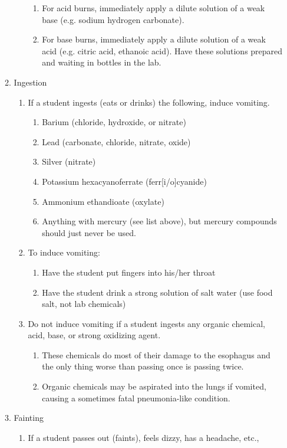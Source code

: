 \begin{enumerate}
\begin{enumerate}
\begin{enumerate}
\begin{enumerate}
\item{For acid burns, immediately apply a dilute solution of a weak base 
(e.g. sodium hydrogen carbonate).}
\item{For base burns, immediately apply a dilute solution of a weak acid 
(e.g. citric acid, ethanoic acid). 
Have these solutions prepared and waiting in bottles in the lab.}
\end{enumerate}
\end{enumerate}
\item{Ingestion}
\begin{enumerate}
\item{If a student ingests (eats or drinks) the following, induce vomiting.}
\begin{enumerate}
\item{Barium (chloride, hydroxide, or nitrate)}
\item{Lead (carbonate, chloride, nitrate, oxide)}
\item{Silver (nitrate)}
\item{Potassium hexacyanoferrate (ferr[i/o]cyanide)}
\item{Ammonium ethandioate (oxylate)}
\item{Anything with mercury (see list above), 
but mercury compounds should just never be used.}
\end{enumerate}
\item{To induce vomiting:}
\begin{enumerate}
\item{Have the student put fingers into his/her throat}
\item{Have the student drink a strong solution of salt water 
(use food salt, not lab chemicals)}
\end{enumerate}
\item{Do not induce vomiting if a student ingests any organic chemical, 
acid, base, or strong oxidizing agent.}
\begin{enumerate}
\item{These chemicals do most of their damage to the esophagus 
and the only thing worse than passing once is passing twice.}
\item{Organic chemicals may be aspirated into the lungs if vomited, 
causing a sometimes fatal pneumonia-like condition.}
\end{enumerate}
\end{enumerate}
\item{Fainting}
\begin{enumerate}
\item{If a student passes out (faints), feels dizzy, has a headache, etc., 
}
\end{enumerate}
\end{enumerate}
\end{enumerate}
